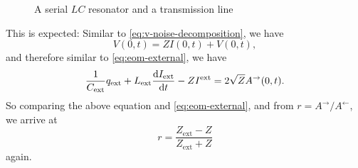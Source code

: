\documentclass[hyperref, a4paper]{article}
\begin{document}
\begin{figure}
    \centering
    
    \caption{A serial $LC$ resonator and a transmission line}
    \label{fig:transmission-load}
\end{figure}
This is expected: Similar to \eqref{eq:v-noise-decomposition},
we have 
\begin{equation}
    V(0, t) = ZI(0, t) + V(0, t),
\end{equation}
and therefore similar to \eqref{eq:eom-external}, we have 
\begin{equation}
    \frac{1}{C_{\text{ext}}} q_{\text{ext}} + L_{\text{ext}} \dv{I_{\text{ext}}}{t} - Z I^{\text{ext}}
    = 2 \sqrt{Z} A^{\rightarrow}(0, t).
\end{equation}
So comparing the above equation and \eqref{eq:eom-external},
and from $r = A^{\rightarrow} / A^{\leftarrow}$, 
we arrive at 
\begin{equation}
    r = \frac{Z_{\text{ext}} - Z}{Z_{\text{ext}} + Z}
\end{equation}
again.
\end{document}
